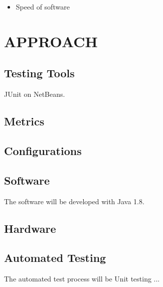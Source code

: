 {\color{black}
\begin{itemize}
\item Speed of software
\end{itemize}

\section[APPROACH]{\bfseries\color{black} APPROACH}


{\color{black}
\subsection{Testing Tools}
JUnit on NetBeans.

\subsection{Metrics}

\subsection{Configurations}

\subsection{Software}
The software will be developed with Java 1.8.

\subsection{Hardware}

\subsection{Automated Testing}
The automated test process will be Unit testing ...
}}
